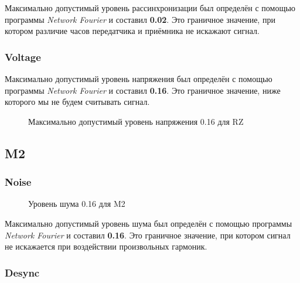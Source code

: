 Максимально допустимый уровень рассинхронизации был определён с помощью программы \textit{Network Fourier} и составил \textbf{0.02}. Это граничное значение, при котором различие часов передатчика и приёмника не искажают сигнал.
\thispagestyle{empty}

\newpage

\subsubsection{Voltage}
Максимально допустимый уровень напряжения был определён с помощью программы \textit{Network Fourier} и составил \textbf{0.16}. Это граничное значение, ниже которого мы не будем считывать сигнал.

\vspace{0.4cm}
\begin{figure}[h]
	\centering
	\caption{Максимально допустимый уровень напряжения 0.16 для RZ}
\end{figure}




\subsection{M2}

\subsubsection{Noise}

\vspace{-0.2cm}
\begin{wrapfigure}{r}{0.65\textwidth}
    \centering
    \caption{Уровень шума 0.16 для M2}
    \vspace{-5cm}
\end{wrapfigure}
\thispagestyle{empty}

Максимально допустимый уровень шума был определён с помощью программы \textit{Network Fourier} и составил \textbf{0.16}. Это граничное значение, при котором сигнал не искажается при воздействии произвольных гармоник.

\newpage

\subsubsection{Desync}

